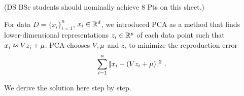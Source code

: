 

\renewcommand{\course}{Machine Learning}
\renewcommand{\exnum}{8}

\exercises
{}
\exercisestitle

(DS BSc students should nominally achieve 8 Pts on this sheet.)



For data $D=\{x_i\}_{i=1}^n$, $x_i\in{\mathbb{R}}^d$, we introduced PCA as a method that finds lower-dimensional representations $z_i\in{\mathbb{R}}^p$ of each data point such that $x_i \approx V z_i + \mu$. PCA chooses $V,\mu$ and $z_i$ to minimize the reproduction error
$$ \sum_{i=1}^n |\!|x_i - (V z_i + \mu)|\!|^2 ~.$$

We derive the solution here step by step.

